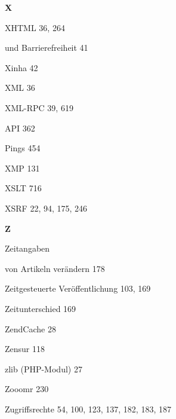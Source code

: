\documentclass{book}
\renewcommand\indexspace{\vspace{11pt}}
\renewcommand\subitem{\par}
\begin{document}
\begin{multicols}{2}
\begin{osp-index}
  \indexspace
{\sffamily\bfseries X}\nopagebreak

  \item XHTML\hspace{1mm} 36, 264
    \subitem und Barrierefreiheit\hspace{1mm} 41
  \item Xinha\hspace{1mm} 42
  \item XML\hspace{1mm} 36
  \item XML-RPC\hspace{1mm} 39, 619
    \subitem API\hspace{1mm} 362
    \subitem Pings\hspace{1mm} 454
  \item XMP\hspace{1mm} 131
  \item XSLT\hspace{1mm} 716
  \item XSRF\hspace{1mm} 22, 94, 175, 246

  \indexspace
{\sffamily\bfseries Z}\nopagebreak

  \item Zeitangaben
    \subitem von Artikeln ver\"andern\hspace{1mm} 178
  \item Zeitgesteuerte Ver\"offentlichung\hspace{1mm} 103, 169
  \item Zeitunterschied\hspace{1mm} 169
  \item ZendCache\hspace{1mm} 28
  \item Zensur\hspace{1mm} 118
  \item zlib (PHP-Modul)\hspace{1mm} 27
  \item Zooomr\hspace{1mm} 230
  \item Zugriffsrechte\hspace{1mm} 54, 100, 123, 137, 182, 183, 187

\end{osp-index}
\end{multicols}
\end{document}
